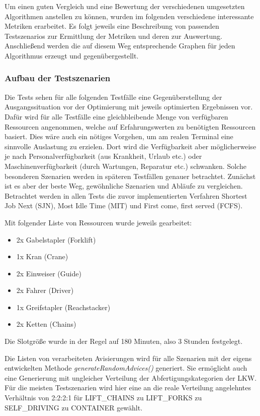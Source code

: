 Um einen guten Vergleich und eine Bewertung der verschiedenen umgesetzten Algorithmen anstellen zu können, wurden im folgenden verschiedene interessante Metriken erarbeitet. Es folgt jeweils eine Beschreibung von passenden Testszenarios zur Ermittlung der Metriken und deren zur Auswertung. Anschließend werden die auf diesem Weg entsprechende Graphen für jeden Algorithmus erzeugt und gegenübergestellt.

\subsubsection{Aufbau der Testszenarien}

Die Tests sehen für alle folgenden Testfälle eine Gegenüberstellung der Ausgangssituation vor der Optimierung mit jeweils optimierten Ergebnissen vor. Dafür wird für alle Testfälle eine gleichbleibende Menge von verfügbaren Ressourcen angenommen, welche auf Erfahrungswerten zu benötigten Ressourcen basiert. Dies wäre auch ein nötiges Vorgehen, um am realen Terminal eine sinnvolle Auslastung zu erzielen. Dort wird die Verfügbarkeit aber möglicherweise je nach Personalverfügbarkeit (aus Krankheit, Urlaub etc.) oder Maschinenverfügbarkeit (durch Wartungen, Reparatur etc.) schwanken. Solche besonderen Szenarien werden in späteren Testfällen genauer betrachtet. Zunächst ist es aber der beste Weg, gewöhnliche Szenarien und Abläufe zu vergleichen. Betrachtet werden in allen Tests die zuvor implementierten Verfahren \glqq{}Shortest Job Next\grqq{} (SJN), \glqq{}Most Idle Time\grqq{} (MIT) und \glqq{}First come, first served\grqq{} (FCFS).

Mit folgender Liste von Ressourcen wurde jeweils gearbeitet:
\begin{itemize}
    \item 2x Gabelstapler (Forklift)
    \item 1x Kran (Crane)
    \item 2x Einweiser (Guide)
    \item 2x Fahrer (Driver)
    \item 1x Greifstapler (Reachstacker)
    \item 2x Ketten (Chains)
\end{itemize}

Die Slotgröße wurde in der Regel auf 180 Minuten, also 3 Stunden festgelegt.

Die Listen von verarbeiteten Avisierungen wird für alle Szenarien mit der eigens entwickelten Methode \textit{generateRandomAdvices()} generiert. Sie ermöglicht auch eine Generierung mit ungleicher Verteilung der Abfertigungskategorien der LKW. Für die meisten Testszenarien wird hier eine an die reale Verteilung angelehntes Verhältnis von 2:2:2:1 für LIFT\_CHAINS zu LIFT\_FORKS zu SELF\_DRIVING zu CONTAINER gewählt. 

